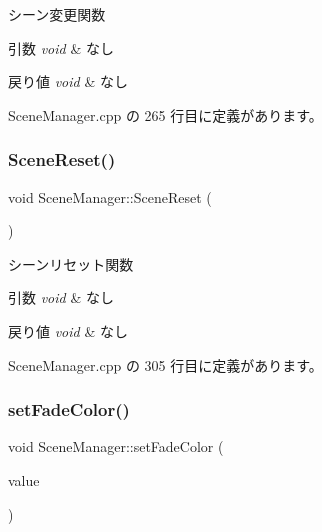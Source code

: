 シーン変更関数 


\begin{DoxyParams}{引数}
{\em void} & なし \\
\hline
\end{DoxyParams}

\begin{DoxyRetVals}{戻り値}
{\em void} & なし \\
\hline
\end{DoxyRetVals}


 Scene\+Manager.\+cpp の 265 行目に定義があります。

\mbox{\label{class_scene_manager_a0652a81c7baff52add9ec4b13205865c}} 
\subsubsection{\texorpdfstring{Scene\+Reset()}{SceneReset()}}
{\footnotesize\ttfamily void Scene\+Manager\+::\+Scene\+Reset (\begin{DoxyParamCaption}{ }\end{DoxyParamCaption})\hspace{0.3cm}{\ttfamily [private]}}



シーンリセット関数 


\begin{DoxyParams}{引数}
{\em void} & なし \\
\hline
\end{DoxyParams}

\begin{DoxyRetVals}{戻り値}
{\em void} & なし \\
\hline
\end{DoxyRetVals}


 Scene\+Manager.\+cpp の 305 行目に定義があります。

\mbox{\label{class_scene_manager_a24e7fa08c34ecacdca37ee35c5c39141}} 
\subsubsection{\texorpdfstring{set\+Fade\+Color()}{setFadeColor()}}
{\footnotesize\ttfamily void Scene\+Manager\+::set\+Fade\+Color (\begin{DoxyParamCaption}\item[{\mbox{\hyperlink{_vector3_d_8h_a680c30c4a07d86fe763c7e01169cd6cc}{X\+Color4}}}]{value }\end{DoxyParamCaption})}



